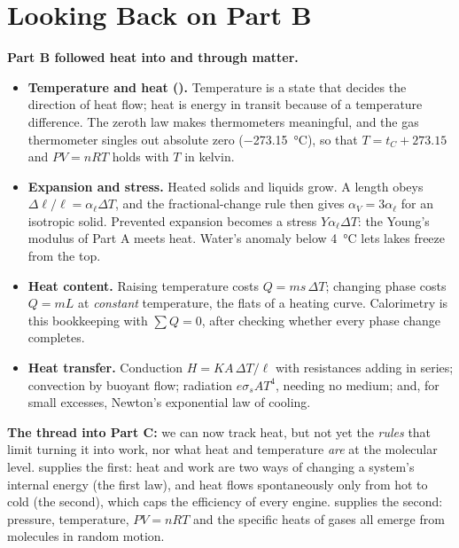 \section*{Looking Back on Part B}

\textbf{Part B followed heat into and through matter.}
\begin{itemize}
\item \textbf{Temperature and heat ().} Temperature is a state that decides the
direction of heat flow; heat is energy in transit because of a temperature difference. The zeroth law
makes thermometers meaningful, and the gas thermometer singles out absolute zero
(\SI{-273.15}{\celsius}), so that $T=t_C+273.15$ and $PV=nRT$ holds with $T$ in kelvin.
\item \textbf{Expansion and stress.} Heated solids and liquids grow. A length obeys
$\Delta\ell/\ell=\alpha_\ell\Delta T$, and the fractional-change rule then gives $\alpha_V=3\alpha_\ell$
for an isotropic solid.
Prevented expansion becomes a stress $Y\alpha_\ell\Delta T$: the Young's modulus of Part A meets
heat. Water's anomaly below \SI{4}{\celsius} lets lakes freeze from the top.
\item \textbf{Heat content.} Raising temperature costs $Q=ms\,\Delta T$; changing phase costs $Q=mL$ at
\emph{constant} temperature, the flats of a heating curve. Calorimetry is this bookkeeping with
$\sum Q=0$, after checking whether every phase change completes.
\item \textbf{Heat transfer.} Conduction $H=KA\,\Delta T/\ell$ with resistances adding in series;
convection by buoyant flow; radiation $e\sigma_{\!s}AT^4$, needing no medium; and, for small excesses,
Newton's exponential law of cooling.
\end{itemize}
\textbf{The thread into Part C:} we can now track heat, but not yet the \emph{rules} that limit turning it
into work, nor what heat and temperature \emph{are} at the molecular level.  supplies
the first: heat and work are two ways of changing a system's internal energy (the first law), and heat
flows spontaneously only from hot to cold (the second), which caps the efficiency of every engine.
 supplies the second: pressure, temperature, $PV=nRT$ and the specific heats of gases
all emerge from molecules in random motion.
